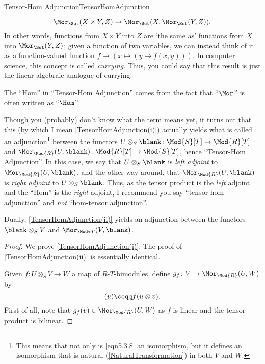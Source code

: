 \begin{thm}{Tensor-Hom Adjunction}{TensorHomAdjunction}
\begin{rmk}
		\begin{equation*}
			\Mor _{\Set}(X\times Y,Z)\rightarrow \Mor _{\Set}(X,\Mor _{\Set}(Y,Z)).
		\end{equation*}
		In other words, functions from $X\times Y$ into $Z$ are `the same as' functions from $X$ into $\Mor _{\Set}(Y,Z)$; given a function of two variables, we can instead think of it as a function-valued function $f\mapsto (x\mapsto (y\mapsto f(x,y)))$.  In computer science, this concept is called \emph{currying}.  Thus, you could say that this result is just the linear algebraic analogue of currying.
	\end{rmk}
	\begin{rmk}
		The ``Hom'' in ``Tensor-Hom Adjunction'' comes from the fact that ``$\Mor$'' is often written as ``$\Hom$''.
	\end{rmk}
	\begin{rmk}
		Though you (probably) don't know what the term means yet, it turns out that this (by which I mean \cref{TensorHomAdjunction(i)}) actually yields what is called an adjunction\footnote{This means that not only is \eqref{eqn5.3.8} an isomorphism, but it defines an isomorphism that is natural (\cref{NaturalTransformation}) in both $V$ and $W$.} between the functors $U\otimes _S\blank \colon \Mod{S}[T]\rightarrow \Mod{R}[T]$ and $\Mor _{\Mod{R}}(U,\blank )\colon \Mod{R}[T]\rightarrow \Mod{S}[T]$, hence ``Tensor-Hom Adjunction''.  In this case, we say that $U\otimes _S\blank$ is \emph{left adjoint} to $\Mor _{\Mod{R}}(U,\blank )$, and the other way around, that $\Mor _{\Mod{R}}(U,\blank )$ is \emph{right adjoint} to $U\otimes _S\blank$.  Thus, as the tensor product is the \emph{left} adjoint and the ``Hom'' is the \emph{right} adjoint, I recommend you say ``tensor-hom adjunction'' and \emph{not} ``hom-tensor adjunction''.
		
		Dually, \cref{TensorHomAdjunction(ii)} yields an adjunction between the functors $\blank \otimes _SV$ and $\Mor _{\Mod*{T}}(V,\blank )$.
	\end{rmk}
	\begin{proof}
		We prove \cref{TensorHomAdjunction(i)}.  The proof of \cref{TensorHomAdjunction(ii)} is essentially identical.
		
		Given $f\colon U\otimes _SV\rightarrow W$ a map of $R$-$T$-bimodules, define $g_f\colon V\rightarrow \Mor _{\Mod{R}}(U,W)$ by
		\begin{equation}
			[g_f(v)](u)\ceqq f(u\otimes v).
		\end{equation}
		First of all, note that $g_f(v)\in \Mor _{\Mod{R}}(U,W)$ as $f$ is linear and the tensor product is bilinear.
		

\end{proof}
\end{thm}
